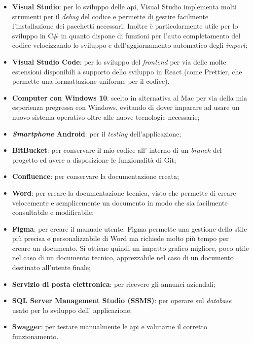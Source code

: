 \begin{itemize}
    \item \textbf{Visual Studio}: per lo sviluppo delle \gls{api}, Visual Studio implementa molti strumenti per 
          il \textit{debug} del codice e permette di gestire facilmente l'installazione dei pacchetti necessari. 
          Inoltre è particolarmente utile per lo sviluppo in C\# in quanto dispone di funzioni per l'auto completamento 
          del codice velocizzando lo sviluppo e dell'aggiornamento automatico degli \textit{import};
    \item \textbf{Visual Studio Code}: per lo sviluppo del \textit{frontend} per via delle molte estensioni 
          disponibili a supporto dello sviluppo in React (come Prettier, che permette una formattazione uniforme 
          per il codice).
    \item \textbf{Computer con Windows 10}: scelto in alternativa al Mac per via della mia esperienza pregressa 
          con Windows, evitando di dover imparare ad usare un nuovo sistema operativo oltre alle nuove tecnologie necessarie;
    \item \textbf{\textit{Smartphone} Android}: per il \textit{testing} dell'applicazione;
    \item \textbf{BitBucket}: per conservare il mio codice all' interno di un \textit{branch} del progetto ed avere a 
        disposizione le funzionalità di Git;
    \item \textbf{Confluence}: per conservare la documentazione creata;
    \item \textbf{Word}: per creare la documentazione tecnica, visto che permette di creare velocemente e semplicemente un 
          documento in modo che sia facilmente consultabile e modificabile;
    \item \textbf{Figma}: per creare il manuale utente. Figma permette una gestione dello stile più precisa e personalizzabile
          di Word ma richiede molto più tempo per creare un documento. Si ottiene quindi un impatto grafico migliore, poco utile nel 
          caso di un documento tecnico, apprezzabile nel caso di un documento destinato all'utente finale;
    \item \textbf{Servizio di posta elettronica}: per ricevere gli annunci aziendali;
    \item \textbf{SQL Server Management Studio (SSMS)}: per operare sul \textit{database} usato per lo sviluppo dell'
          applicazione;
    \item \textbf{Swagger}: per testare manualmente le \gls{api} e valutarne il corretto funzionamento.
\end{itemize}
